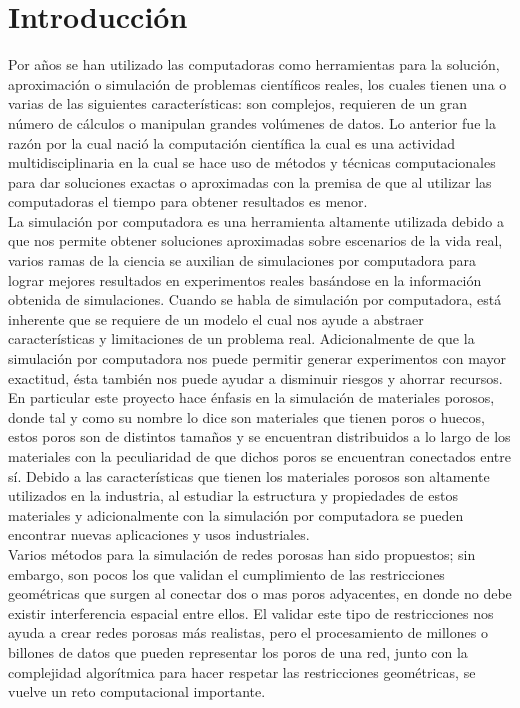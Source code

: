 \chapter{Introducción}
\label{champ:intro}
\bigskip
\barra
\bigskip

Por años se han utilizado las computadoras como herramientas para la solución, aproximación o simulación de problemas científicos reales, los cuales tienen una o varias de las siguientes características: son complejos, requieren de un gran número de cálculos o manipulan grandes volúmenes de datos. Lo anterior fue la razón por la cual nació la computación científica la cual es una actividad multidisciplinaria en la cual se hace uso de métodos y técnicas computacionales para dar soluciones exactas o aproximadas con la premisa de que al utilizar las computadoras el tiempo para obtener resultados es menor.\\

La simulación por computadora es una herramienta altamente utilizada debido a que nos permite obtener soluciones aproximadas sobre escenarios de la vida real, varios ramas de la ciencia se auxilian de simulaciones por computadora para lograr mejores resultados en experimentos reales basándose en la información obtenida de simulaciones. Cuando se habla de simulación por computadora, está inherente que se requiere de un modelo el cual nos ayude a abstraer características y limitaciones de un problema real. Adicionalmente de que la simulación por computadora nos puede permitir generar experimentos con mayor exactitud, ésta también nos puede ayudar a disminuir riesgos y ahorrar recursos.\\

En particular este proyecto hace énfasis en la simulación de materiales porosos, donde tal y como su nombre lo dice son materiales que tienen poros o huecos, estos poros son de distintos tamaños y se encuentran distribuidos a lo largo de los materiales con la peculiaridad de que dichos poros se encuentran conectados entre sí. Debido a las características que tienen los materiales porosos son altamente utilizados en la industria, al estudiar la estructura y propiedades de estos materiales y adicionalmente con la simulación por computadora se pueden encontrar nuevas aplicaciones y usos industriales.\\

Varios métodos para la simulación de redes porosas han sido propuestos; sin embargo, son pocos los que validan el cumplimiento de las restricciones geométricas que surgen al conectar dos o mas poros adyacentes, en donde no debe existir interferencia espacial entre ellos. El validar este tipo de restricciones nos ayuda a crear redes porosas más realistas,
pero el procesamiento de millones o billones de datos que pueden representar los poros de una red, junto con la complejidad algorítmica para hacer respetar las restricciones geométricas, se vuelve un reto computacional importante.\\

